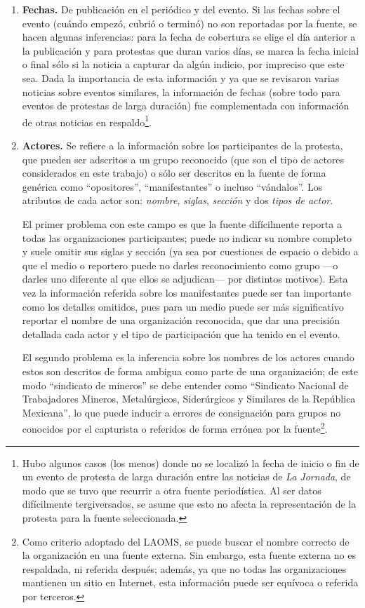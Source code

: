 \documentclass[letterpaper, 11pt]{book}
\theoremstyle{definition}
\theoremstyle{remark}
\begin{document}
\begin{enumerate}
    \item \textbf{Fechas.} 
    De publicación en el periódico y del evento. 
    Si las fechas sobre el evento (cuándo empezó, cubrió o terminó) no son reportadas por la fuente, se hacen algunas inferencias: para la fecha de cobertura se elige el día anterior a la publicación y para protestas que duran varios días, se marca la fecha inicial o final sólo si la noticia a capturar da algún indicio, por impreciso que este sea. 
    Dada la importancia de esta información y ya que se revisaron varias noticias sobre eventos similares, la información de fechas (sobre todo para eventos de protestas de larga duración) fue complementada con información de otras noticias en respaldo\footnote{
    Hubo algunos casos (los menos) donde no se localizó la fecha de inicio o fin de un evento de protesta de larga duración entre las noticias de \emph{La Jornada}, de modo que se tuvo que recurrir a otra fuente periodística. Al ser datos difícilmente tergiversados, se asume que esto no afecta la representación de la protesta para la fuente seleccionada.}.
    

    \item \textbf{Actores.} 
    Se refiere a la información sobre los participantes de la protesta, que pueden ser adscritos a un grupo reconocido (que son el tipo de actores considerados en este trabajo) o sólo ser descritos en la fuente de forma genérica como ``opositores'', ``manifestantes'' o incluso ``vándalos''. 
    Los atributos de cada actor son: \emph{nombre}, \emph{siglas}, \emph{sección} y dos \emph{tipos de actor}. 
    
    El primer problema con este campo es que la fuente difícilmente reporta a todas las organizaciones participantes; puede no indicar su nombre completo y suele omitir sus siglas y sección (ya sea por cuestiones de espacio o debido a que el medio o reportero puede no darles reconocimiento como grupo ---o darles uno diferente al que ellos se adjudican--- por distintos motivos). 
    Esta vez la información referida sobre los manifestantes puede ser tan importante como los detalles omitidos, pues para un medio puede ser más significativo reportar el nombre de una organización reconocida, que dar una precisión detallada cada actor y el tipo de participación que ha tenido en el evento. 
    
    El segundo problema es la inferencia sobre los nombres de los actores cuando estos son descritos de forma ambigua como parte de una organización; de este modo ``sindicato de mineros'' se debe entender como ``Sindicato Nacional de Trabajadores Mineros, Metalúrgicos, Siderúrgicos y Similares de la República Mexicana'', lo que puede inducir a errores de consignación para grupos no conocidos por el capturista o referidos de forma errónea por la fuente\footnote{
    Como criterio adoptado del LAOMS, se puede buscar el nombre correcto de la organización en una fuente externa. 
    Sin embargo, esta fuente externa no es respaldada, ni referida después; además, ya que no todas las organizaciones mantienen un sitio en Internet, esta información puede ser equívoca o referida por terceros.}. 
    

\end{enumerate}
\end{document}
